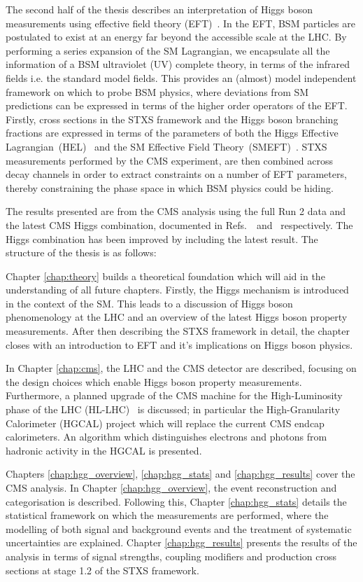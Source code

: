 The second half of the thesis describes an interpretation of Higgs boson measurements using effective field theory (EFT)~\cite{}. In the EFT, BSM particles are postulated to exist at an energy far beyond the accessible scale at the LHC. By performing a series expansion of the SM Lagrangian, we encapsulate all the information of a BSM ultraviolet (UV) complete theory, in terms of the infrared fields i.e. the standard model fields. This provides an (almost) model independent framework on which to probe BSM physics, where deviations from SM predictions can be expressed in terms of the higher order operators of the EFT. Firstly, cross sections in the STXS framework and the Higgs boson branching fractions are expressed in terms of the parameters of both the Higgs Effective Lagrangian~(HEL)~\cite{} and the SM Effective Field Theory~(SMEFT)~\cite{}. STXS measurements performed by the CMS experiment, are then combined across decay channels in order to extract constraints on a number of EFT parameters, thereby constraining the phase space in which BSM physics could be hiding.

The results presented are from the CMS \Hgg analysis using the full Run 2 data and the latest CMS Higgs combination, documented in Refs.~\cite{}~and~\cite{} respectively. The Higgs combination has been improved by including the latest \Hgg result. The structure of the thesis is as follows: 

Chapter {\color{blue}\ref{chap:theory}} builds a theoretical foundation which will aid in the understanding of all future chapters. Firstly, the Higgs mechanism is introduced in the context of the SM. This leads to a discussion of Higgs boson phenomenology at the LHC and an overview of the latest Higgs boson property measurements. After then describing the STXS framework in detail, the chapter closes with an introduction to EFT and it's implications on Higgs boson physics.

In Chapter {\color{blue}\ref{chap:cms}}, the LHC and the CMS detector are described, focusing on the design choices which enable Higgs boson property measurements. Furthermore, a planned upgrade of the CMS machine for the High-Luminosity phase of the LHC (HL-LHC)~\cite{} is discussed; in particular the High-Granularity Calorimeter (HGCAL) project which will replace the current CMS endcap calorimeters. An algorithm which distinguishes electrons and photons from hadronic activity in the HGCAL is presented.

Chapters {\color{blue}\ref{chap:hgg_overview}}, {\color{blue}\ref{chap:hgg_stats}} and {\color{blue}\ref{chap:hgg_results}} cover the CMS \Hgg analysis. In Chapter {\color{blue}\ref{chap:hgg_overview}}, the event reconstruction and categorisation is described. Following this, Chapter {\color{blue}\ref{chap:hgg_stats}} details the statistical framework on which the measurements are performed, where the modelling of both signal and background events and the treatment of systematic uncertainties are explained. Chapter {\color{blue}\ref{chap:hgg_results}} presents the results of the analysis in terms of signal strengths, coupling modifiers and production cross sections at stage 1.2 of the STXS framework.

